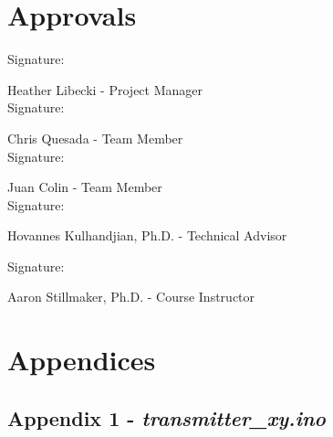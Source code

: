 \section{Approvals}
\setlength{\parindent}{15ex}
\vspace{0.5in}
	\begin{flushleft}
	Signature: \hrulefill
	
	\hspace*{0mm}\phantom{Approved: }Heather Libecki - Project Manager\\
	\vspace{12pt}
	Signature: \hrulefill
	
	\hspace*{0mm}\phantom{Approved: }Chris Quesada - Team Member\\
	\vspace{12pt}
	Signature: \hrulefill
	
	\hspace*{0mm}\phantom{Approved: }Juan Colin - Team Member\\
	\vspace{12pt}
	Signature: \hrulefill
	
	\hspace*{0mm}\phantom{Approved: }Hovannes Kulhandjian, Ph.D. -
	 Technical Advisor\\
	 \vspace{12pt}
	 
	 Signature: \hrulefill
	 
	 \hspace*{0mm}\phantom{Approved: }Aaron Stillmaker, Ph.D. -
	 Course Instructor\\
	 \vspace{12pt}


\end{flushleft}\par
\newpage


	
		
\newpage
{}
\section{Appendices}

\subsection{Appendix 1 - \textit{transmitter\_xy.ino}}\label{A1}

\newpage

